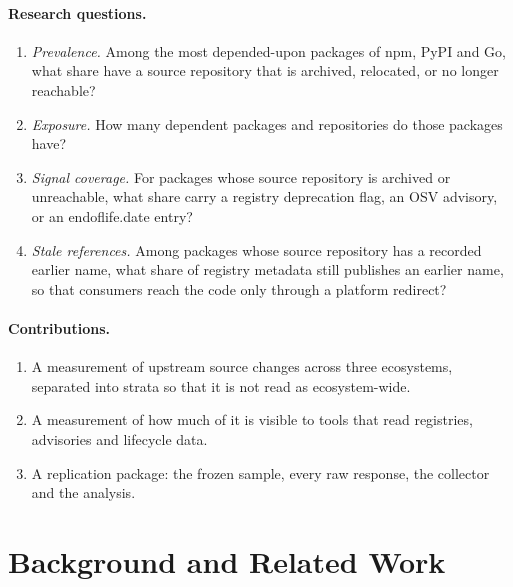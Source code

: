 \documentclass[11pt,a4paper]{article}
\begin{document}

\paragraph{Research questions.}
\begin{enumerate}[leftmargin=*,label=RQ\arabic*.]
  \item \emph{Prevalence.} Among the most depended-upon packages of npm,
    PyPI and Go, what share have a source repository that is archived,
    relocated, or no longer reachable?
  \item \emph{Exposure.} How many dependent packages and repositories do
    those packages have?
  \item \emph{Signal coverage.} For packages whose source repository is
    archived or unreachable, what share carry a registry deprecation
    flag, an OSV advisory, or an endoflife.date entry?
  \item \emph{Stale references.} Among packages whose source repository
    has a recorded earlier name, what share of registry metadata still
    publishes an earlier name, so that consumers reach the code only
    through a platform redirect?
\end{enumerate}

\paragraph{Contributions.}
\begin{enumerate}[leftmargin=*]
  \item A measurement of upstream source changes across three
    ecosystems, separated into strata so that it is not read as
    ecosystem-wide.
  \item A measurement of how much of it is visible to tools that read
    registries, advisories and lifecycle data.
  \item A replication package: the frozen sample, every raw response,
    the collector and the analysis.
\end{enumerate}

\section{Background and Related Work}
\label{sec:related}
\end{document}
